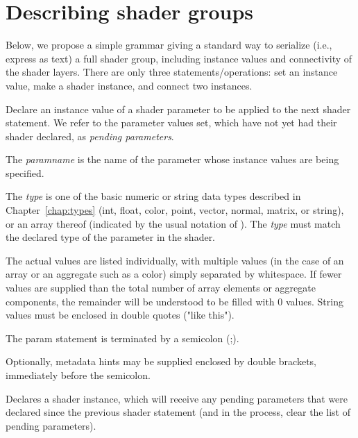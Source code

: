 \documentclass[11pt,letterpaper]{book}
\def\color{{\cf color}\xspace}
\begin{document}
\chapter{Describing shader groups}
\label{chap:describingshadergroups}
\label{sec:serialize}

Below, we propose a simple grammar giving a standard way to serialize (i.e.,
express as text) a full shader group, including instance values and
connectivity of the shader layers. There are only three
statements/operations: set an instance value, make a shader instance, and
connect two instances.


Declare an instance value of a shader parameter to be applied to the next
{\cf shader} statement. We refer to the parameter values set, which have
not yet had their shader declared, as \emph{pending parameters}.

The \emph{paramname} is the name of the parameter whose instance values are
being specified.

The \emph{type} is one of the basic numeric or
string data types described in Chapter~\ref{chap:types} ({\cf int}, {\cf
float}, {\cf color}, {\cf point}, {\cf vector}, {\cf normal}, {\cf matrix},
or {\cf string}), or an array thereof (indicated by the usual notation of
{}). The \emph{type} must match the declared type
of the parameter in the shader.

The actual values are listed individually, with multiple values (in the
case of an array or an aggregate such as a \color) simply separated by
whitespace. If fewer values are supplied than the total number of array
elements or aggregate components, the remainder will be understood to be
filled with 0 values. String values must be enclosed in double quotes
({\cf "like this"}).

The {\cf param} statement is terminated by a semicolon ({\cf ;}).

Optionally, metadata hints may be supplied enclosed by double brackets,
immediately before the semicolon.
\apiend


Declares a shader instance, which will receive any pending parameters that
were declared since the previous {\cf shader} statement (and in the process,
clear the list of pending parameters).
\end{document}
